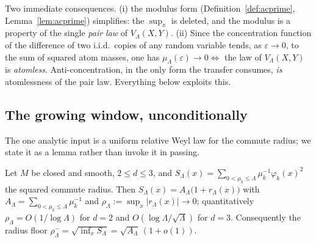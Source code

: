 \begin{remark}
Two immediate consequences.  (i) the modulus form (Definition~\ref{def:acprime},
Lemma~\ref{lem:acprime}) simplifies:
the $\sup_x$ is deleted, and the modulus is a property of the single
\emph{pair law} of $V_\Lambda(X,Y)$.  (ii) Since the concentration function of
the difference of two i.i.d.\ copies of any random variable tends, as
$\varepsilon\to0$, to the sum of squared atom masses, one has
$\mu_\Lambda(\varepsilon)\to0\iff$ the law of $V_\Lambda(X,Y)$ is
\emph{atomless}.  Anti-concentration, in the only form the transfer consumes,
\emph{is} atomlessness of the pair law.  Everything below exploits this.
\end{remark}

\subsection{The growing window, unconditionally}\label{ssec:growing}

The one analytic input is a uniform relative Weyl law for the commute radius; we
state it as a lemma rather than invoke it in passing.

\begin{lemma}\label{lem:weyl-radius}
Let $M$ be closed and smooth, $2\le d\le3$, and
$S_\Lambda(x)=\sum_{0<\mu_k\le\Lambda}\mu_k^{-1}\varphi_k(x)^2$ the squared commute
radius. Then $S_\Lambda(x)=A_\Lambda\bigl(1+r_\Lambda(x)\bigr)$ with
$A_\Lambda=\sum_{0<\mu_k\le\Lambda}\mu_k^{-1}$ and
$\rho_\Lambda:=\sup_x\lvert r_\Lambda(x)\rvert\to0$; quantitatively
$\rho_\Lambda=O(1/\log\Lambda)$ for $d=2$ and $O(\log\Lambda/\sqrt\Lambda)$ for
$d=3$. Consequently the radius floor $\rho^-_\Lambda=\sqrt{\inf_x S_\Lambda}
=\sqrt{A_\Lambda}\,(1+o(1))$.
\end{lemma}

